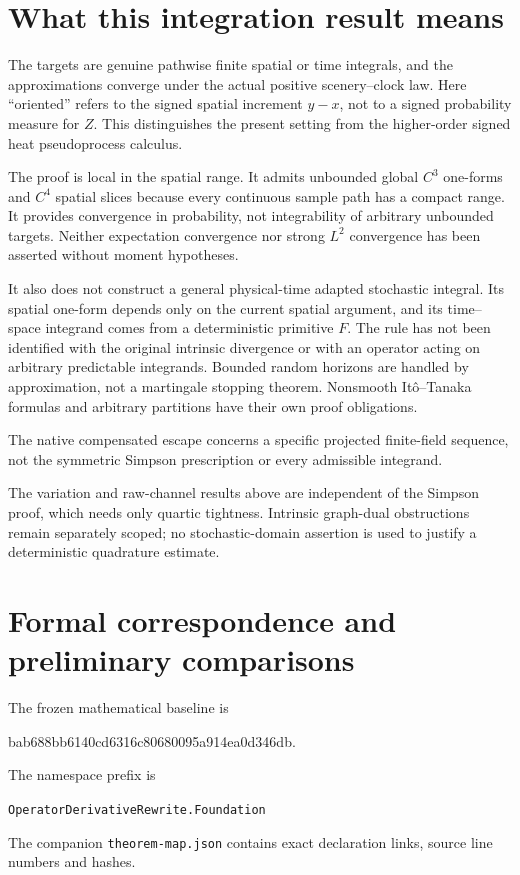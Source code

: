 \documentclass[11pt]{article}
\theoremstyle{remark}\newtheorem{remark}[theorem]{Remark}
\newcommand{\code}[1]{{\small\nolinkurl{#1}}}
\begin{document}
\section{What this integration result means}
The targets are genuine pathwise finite spatial or time integrals,
and the approximations converge under the actual positive
scenery--clock law. Here ``oriented'' refers to the signed spatial
increment $y-x$, not to a signed probability measure for $Z$.
This distinguishes the present setting from the higher-order
signed heat pseudoprocess calculus.

The proof is local in the spatial range. It admits unbounded
global $C^3$ one-forms and $C^4$ spatial slices because every
continuous sample path has a compact range. It provides
convergence in probability, not integrability of arbitrary
unbounded targets. Neither expectation convergence nor strong
$L^2$ convergence has been asserted without moment hypotheses.

It also does not construct a general physical-time adapted
stochastic integral. Its spatial one-form depends only on the
current spatial argument, and its time--space integrand comes
from a deterministic primitive $F$. The rule has not been
identified with the original intrinsic divergence or with an
operator acting on arbitrary predictable integrands. Bounded
random horizons are handled by approximation, not a martingale
stopping theorem. Nonsmooth It\^o--Tanaka formulas and arbitrary
partitions have their own proof obligations.

The native compensated escape concerns a specific projected finite-field sequence, not the symmetric Simpson prescription or every admissible integrand.

The variation and raw-channel results above are independent of the
Simpson proof, which needs only quartic tightness. Intrinsic
graph-dual obstructions remain separately scoped; no stochastic-domain
assertion is used to justify a deterministic quadrature estimate.

\section{Formal correspondence and preliminary comparisons}
The frozen mathematical baseline is
\begin{center}\small\ttfamily
bab688bb6140cd6316c80680095a914ea0d346db.
\end{center}
The namespace prefix is
\begin{center}\code{OperatorDerivativeRewrite.Foundation}\end{center}
The companion \code{theorem-map.json} contains exact declaration
links, source line numbers and hashes.
\end{document}
